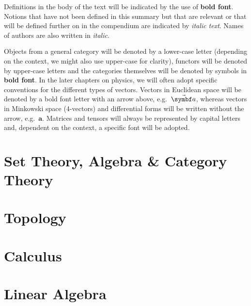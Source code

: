 \documentclass[12pt, a4paper]{report}
\begin{document}
   Definitions in the body of the text will be indicated by the use of \textbf{bold font}. Notions that have not been defined in this summary but that are relevant or that will be defined further on in the compendium are indicated by \textit{italic text}. Names of authors are also written in \textit{italic}.

   Objects from a general category will be denoted by a lower-case letter (depending on the context, we might also use upper-case for clarity), functors will be denoted by upper-case letters and the categories themselves will be denoted by symbols in \textbf{bold font}. In the later chapters on physics, we will often adopt specific conventions for the different types of vectors. Vectors in Euclidean space will be denoted by a bold font letter with an arrow above, e.g.~$\vector{a}$, whereas vectors in Minkowski space (4-vectors) and differential forms will be written without the arrow, e.g.~$\symbf{a}$. Matrices and tensors will always be represented by capital letters and, dependent on the context, a specific font will be adopted.

\part{Set Theory, Algebra \& Category Theory}






\part{Topology}









\part{Calculus}







\part{Linear Algebra}







\end{document}
